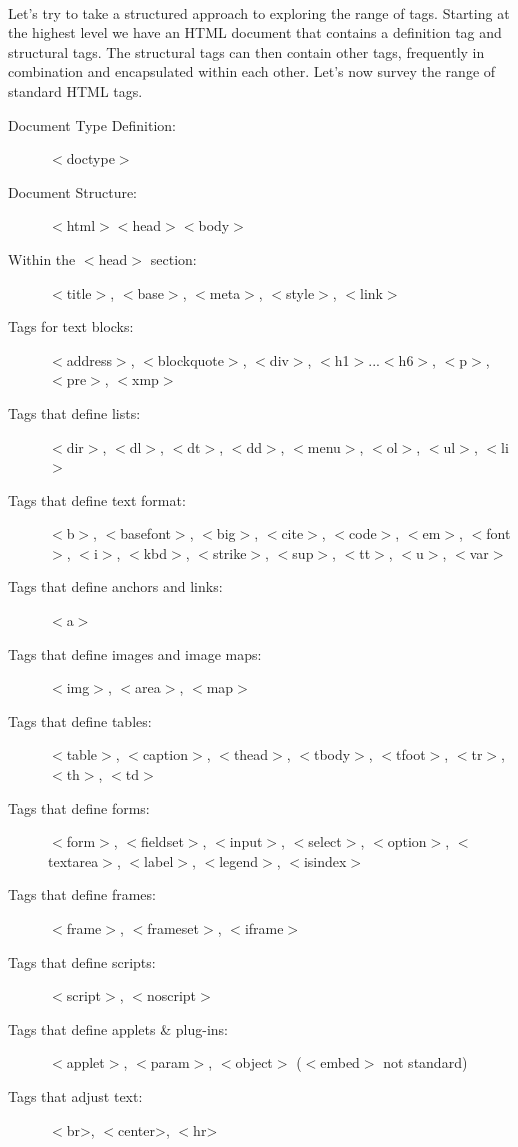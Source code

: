 \paragraph{} Let's try to take a structured approach to exploring the range of tags. Starting at the highest level we have an HTML document that contains a definition tag and structural tags. The structural tags can then contain other tags, frequently in combination and encapsulated within each other. Let's now survey the range of standard HTML tags.
\begin{description}
\item [Document Type Definition:] $<$doctype$>$
\item [Document Structure:] $<$html$>$$<$head$>$$<$body$>$
\item [Within the $<$head$>$ section:] $<$title$>$, $<$base$>$, $<$meta$>$, $<$style$>$, $<$link$>$
\item [Tags for text blocks:] $<$address$>$, $<$blockquote$>$, $<$div$>$, $<$h1$>$...$<$h6$>$, $<$p$>$, $<$pre$>$, $<$xmp$>$
\item [Tags that define lists:] $<$dir$>$, $<$dl$>$, $<$dt$>$, $<$dd$>$, $<$menu$>$, $<$ol$>$, $<$ul$>$, $<$li$>$ 
\item [Tags that define text format:] $<$b$>$, $<$basefont$>$, $<$big$>$, $<$cite$>$, $<$code$>$, $<$em$>$, $<$font$>$, $<$i$>$, $<$kbd$>$, $<$strike$>$, $<$sup$>$, $<$tt$>$, $<$u$>$, $<$var$>$
\item [Tags that define anchors and links:] $<$a$>$ 
\item [Tags that define images and image maps:] $<$img$>$, $<$area$>$, $<$map$>$ 
\item [Tags that define tables:] $<$table$>$, $<$caption$>$, $<$thead$>$, $<$tbody$>$, $<$tfoot$>$, $<$tr$>$, $<$th$>$, $<$td$>$ 
\item [Tags that define forms:] $<$form$>$, $<$fieldset$>$, $<$input$>$, $<$select$>$, $<$option$>$, $<$textarea$>$, $<$label$>$, $<$legend$>$, $<$isindex$>$
\item [Tags that define frames:] $<$frame$>$, $<$frameset$>$, $<$iframe$>$
\item [Tags that define scripts:] $<$script$>$, $<$noscript$>$
\item [Tags that define applets \& plug-ins:] $<$applet$>$, $<$param$>$, $<$object$>$ ($<$embed$>$ not standard)
\item [Tags that adjust text:] $<$br>, $<$center>, $<$hr>
\end{description}

